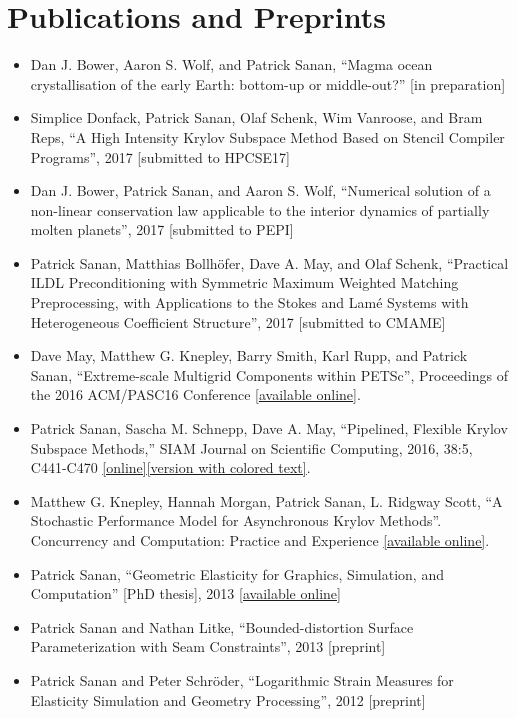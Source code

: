 \documentclass[12pt]{article}
\begin{document}
\section*{Publications and Preprints}
\begin{itemize}
\item Dan J. Bower, Aaron S. Wolf, and Patrick Sanan, ``Magma ocean crystallisation of the early Earth: bottom-up or middle-out?'' [in preparation]
\item Simplice Donfack, Patrick Sanan, Olaf Schenk, Wim Vanroose, and Bram Reps, ``A High Intensity Krylov Subspace Method Based on Stencil Compiler Programs'', 2017 [submitted to HPCSE17]
\item Dan J. Bower, Patrick Sanan, and Aaron S. Wolf, ``Numerical solution of a non-linear conservation law applicable to the interior dynamics of partially molten planets'', 2017 [submitted to PEPI]
\item Patrick Sanan, Matthias Bollh\"{o}fer, Dave A. May, and Olaf Schenk, ``Practical ILDL Preconditioning with Symmetric Maximum Weighted Matching Preprocessing, with Applications to the Stokes and Lam\'{e} Systems with Heterogeneous Coefficient Structure'', 2017 [submitted to CMAME]
\item Dave May, Matthew G. Knepley, Barry Smith, Karl Rupp, and Patrick Sanan, ``Extreme-scale Multigrid Components within PETSc'', Proceedings of the 2016 ACM/PASC16 Conference [\href{http://dl.acm.org/citation.cfm?doid=2929908.2929913}{available online}].
\item Patrick Sanan, Sascha M. Schnepp, Dave A. May, ``Pipelined, Flexible Krylov Subspace Methods,'' SIAM Journal on Scientific Computing, 2016, 38:5, C441-C470 \href{http://dx.doi.org/10.1137/15M1049130}{[online]}\href{http://arxiv.org/abs/1511.07226}{[version with colored text]}.
\item Matthew G. Knepley, Hannah Morgan, Patrick Sanan, L. Ridgway Scott, ``A Stochastic Performance Model for Asynchronous Krylov Methods''. Concurrency and Computation: Practice and Experience \href{http://onlinelibrary.wiley.com/doi/10.1002/cpe.3820/full}{[available online]}.
\item Patrick Sanan, ``Geometric Elasticity for Graphics, Simulation, and Computation'' [PhD thesis], 2013 \href{http://resolver.caltech.edu/CaltechTHESIS:12052013-121547860}{[available online]}
\item Patrick Sanan and Nathan Litke, ``Bounded-distortion Surface Parameterization with Seam Constraints'', 2013 [preprint]
\item Patrick Sanan and Peter Schr\"{o}der, ``Logarithmic Strain Measures for Elasticity Simulation and Geometry Processing'', 2012 [preprint]

\end{itemize}
\end{document}
